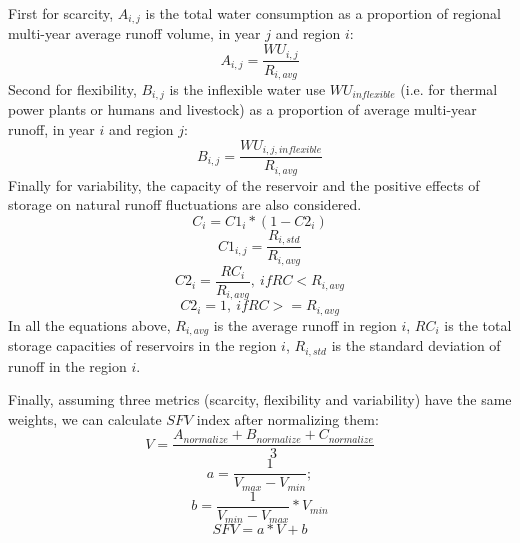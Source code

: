 \documentclass[9pt,twoside,lineno]{pnas-new}
\begin{document}
	First for scarcity, $A_{i, j}$ is the total water consumption as a proportion of regional multi-year average runoff volume, in year $j$ and region $i$:
	$$ A_{i, j} = \frac{WU_{i,j}}{R_{i, avg}} $$
	Second for flexibility, $B_{i, j}$ is the inflexible water use $WU_{inflexible}$ (i.e. for thermal power plants or humans and livestock) as a proportion of average multi-year runoff, in year $i$ and region $j$:
	$$ B_{i, j} = \frac{WU_{i, j, inflexible}}{R_{i, avg}} $$
	Finally for variability, the capacity of the reservoir and the positive effects of storage on natural runoff fluctuations are also considered.
	$$ C_i = C1_i * (1 - C2_i) $$
	$$ C1_{i, j} = \frac{R_{i, std}}{R_{i, avg}} $$
	$$ C2_{i} = \frac{RC_{i}}{R_{i, avg}}, \ if RC < R_{i, avg} $$
	$$ C2_{i} = 1, \ if RC >= R_{i, avg} $$
	In all the equations above, $R_{i, avg}$ is the average runoff in region $i$, $RC_i$ is the total storage capacities of reservoirs in the region $i$, $R_{i, std}$ is the standard deviation of runoff in the region $i$.

	Finally, assuming three metrics (scarcity, flexibility and variability) have the same weights, we can calculate $SFV$ index after normalizing them:
	$$ V = \frac{A_{normalize} + B_{normalize} + C_{normalize}}{3} $$
	$$ a = \frac{1}{V_{max} - V_{min}}; $$
	$$ b = \frac{1}{V_{min} - V_{max}} * V_{min} $$
	$$ SFV = a * V + b $$
\end{document}
